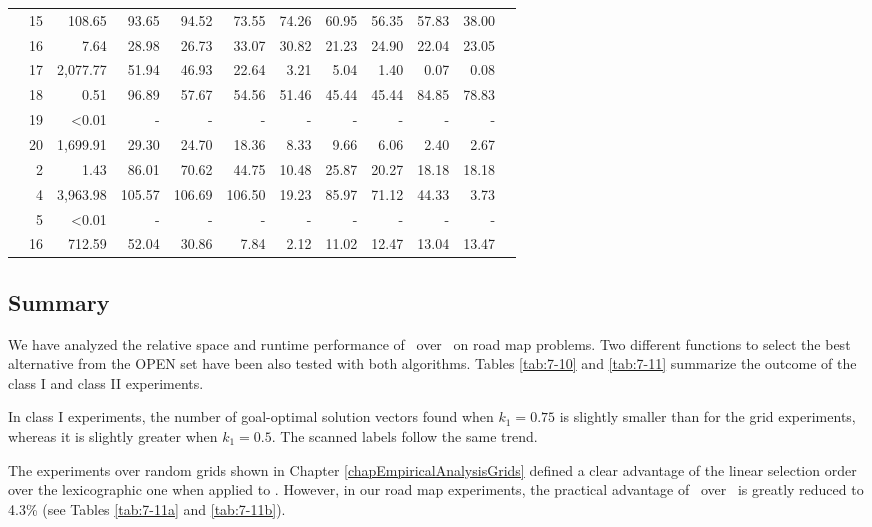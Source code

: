 \begin{table}
{\begin{tabular}{crrrrrrrrrrr}
& 15 & 108.65 & 93.65 & 94.52 & 73.55 & 74.26 & 60.95 & 56.35 & 57.83 & 38.00 \\ 
& 16 & 7.64 & 28.98 & 26.73 & 33.07 & 30.82 & 21.23 & 24.90 & 22.04 & 23.05 \\ 
& 17 & 2,077.77 & 51.94 & 46.93 & 22.64 & 3.21 & 5.04 & 1.40 & 0.07 & 0.08 \\ 
& 18 & 0.51 & 96.89 & 57.67 & 54.56 & 51.46 & 45.44 & 45.44 & 84.85 & 78.83 \\ 
& 19 & <0.01 & - & - & - & - & - & - & - & - \\
& 20 & 1,699.91 & 29.30 & 24.70 & 18.36 & 8.33 & 9.66 & 6.06 & 2.40 & 2.67 \\ 
\noalign{\medskip}
\parbox[t]{2mm}{} &
2 & 1.43 & 86.01 & 70.62 & 44.75 & 10.48 & 25.87 & 20.27 & 18.18 & 18.18 \\
& 4 & 3,963.98 & 105.57 & 106.69 & 106.50 & 19.23 & 85.97 & 71.12 & 44.33 & 3.73 \\
& 5 & <0.01 & - & - & - & - & - & - & - & - \\
& 16 & 712.59 & 52.04 & 30.86 & 7.84 & 2.12 & 11.02 & 12.47 & 13.04 & 13.47 \\
\hline
\end{tabular}
}
\end{table} 

\subsection{Summary}
\label{chapEmpiricalAnalysis:subsec:summarydimacslexgo}

We have analyzed the relative space and runtime performance of \lexgo \ over \namoa \ on road map problems. Two different functions to select the best alternative from the OPEN set have been also tested with both algorithms. Tables \ref{tab:7-10} and \ref{tab:7-11} summarize the outcome of the class I and class II experiments. 

In class I experiments, the number of goal-optimal solution vectors found when $k_1=0.75$ is slightly smaller than for the grid experiments, whereas it is slightly greater when $k_1=0.5$. The scanned labels follow the same trend.  

The experiments over random grids shown in Chapter \ref{chapEmpiricalAnalysisGrids} defined a clear advantage of the linear selection order over the lexicographic one when applied to \namoa. However, in our road map experiments, the practical advantage of \namoalin \ over \namoalex \ is greatly reduced to 4.3\% (see Tables \ref{tab:7-11a} and \ref{tab:7-11b}). 

